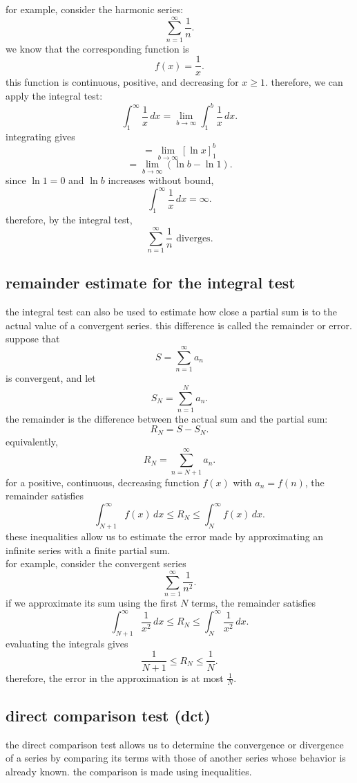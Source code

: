 \documentclass{article}
\begin{document}
for example, consider the harmonic series:
\[
\sum_{n=1}^{\infty}\frac{1}{n}.
\]
we know that the corresponding function is
\[
f(x)=\frac{1}{x}.
\]
this function is continuous, positive, and decreasing for $x\geq1$. therefore, we can apply the integral test:
\[
\int_1^\infty\frac{1}{x}\,dx
=
\lim_{b\to\infty}\int_1^b\frac{1}{x}\,dx.
\]
integrating gives
\[
=
\lim_{b\to\infty}[\ln x]_1^b
\]
\[
=
\lim_{b\to\infty}(\ln b-\ln1).
\]
since $\ln1=0$ and $\ln b$ increases without bound,
\[
\int_1^\infty\frac{1}{x}\,dx=\infty.
\]
therefore, by the integral test,
\[
\boxed{
\sum_{n=1}^{\infty}\frac{1}{n}
\text{ diverges.}
}
\]

\subsection{remainder estimate for the integral test}

the integral test can also be used to estimate how close a partial sum is to the actual value of a convergent series. this difference is called the remainder or error.\\

suppose that
\[
S=\sum_{n=1}^{\infty}a_n
\]
is convergent, and let
\[
S_N=\sum_{n=1}^{N}a_n.
\]
the remainder is the difference between the actual sum and the partial sum:
\[
R_N=S-S_N.
\]
equivalently,
\[
R_N=\sum_{n=N+1}^{\infty}a_n.
\]
for a positive, continuous, decreasing function $f(x)$ with $a_n=f(n)$, the remainder satisfies
\[
\boxed{
\int_{N+1}^{\infty}f(x)\,dx
\leq R_N
\leq
\int_N^\infty f(x)\,dx.
}
\]
these inequalities allow us to estimate the error made by approximating an infinite series with a finite partial sum.\\

for example, consider the convergent series
\[
\sum_{n=1}^{\infty}\frac{1}{n^2}.
\]
if we approximate its sum using the first $N$ terms, the remainder satisfies
\[
\int_{N+1}^{\infty}\frac{1}{x^2}\,dx
\leq R_N
\leq
\int_N^\infty\frac{1}{x^2}\,dx.
\]
evaluating the integrals gives
\[
\frac{1}{N+1}\leq R_N\leq\frac{1}{N}.
\]
therefore, the error in the approximation is at most $\frac{1}{N}$.\\

\subsection{direct comparison test (dct)}

the direct comparison test allows us to determine the convergence or divergence of a series by comparing its terms with those of another series whose behavior is already known. the comparison is made using inequalities.\\
\end{document}
